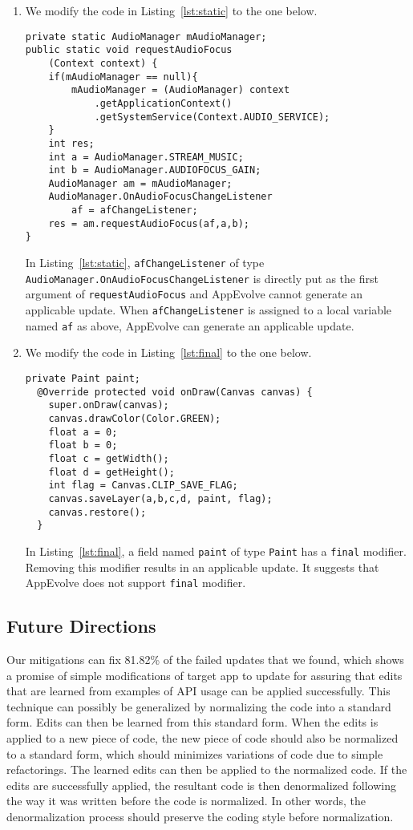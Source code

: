 \begin{enumerate}
\item We modify the code in Listing~\ref{lst:static} to the one below.
\begin{lstlisting}[language=text,numbers=none]
private static AudioManager mAudioManager;
public static void requestAudioFocus
    (Context context) {
    if(mAudioManager == null){
        mAudioManager = (AudioManager) context
            .getApplicationContext()
            .getSystemService(Context.AUDIO_SERVICE);
    }
    int res;
    int a = AudioManager.STREAM_MUSIC;
    int b = AudioManager.AUDIOFOCUS_GAIN;
    AudioManager am = mAudioManager;
    AudioManager.OnAudioFocusChangeListener
        af = afChangeListener;
    res = am.requestAudioFocus(af,a,b);
}
\end{lstlisting}
In Listing~\ref{lst:static}, {\tt afChangeListener} of type {\tt AudioManager.OnAudioFocusChangeListener} is directly put as the first argument of {\tt requestAudioFocus} and AppEvolve cannot generate an applicable update. When {\tt afChangeListener} is assigned to a local variable named {\tt af} as above, AppEvolve can generate an applicable update.

\item We modify the code in Listing~\ref{lst:final} to the one below.
\begin{lstlisting}[language=text,numbers=none]
private Paint paint;
  @Override protected void onDraw(Canvas canvas) {
    super.onDraw(canvas);
    canvas.drawColor(Color.GREEN);
    float a = 0;
    float b = 0;
    float c = getWidth();
    float d = getHeight();
    int flag = Canvas.CLIP_SAVE_FLAG;
    canvas.saveLayer(a,b,c,d, paint, flag);
    canvas.restore();
  }
\end{lstlisting}
In Listing~\ref{lst:final}, a field named {\tt paint} of type {\tt Paint} has a {\tt final} modifier. Removing this modifier results in an applicable update. It suggests that AppEvolve does not support {\tt final} modifier.
\end{enumerate}


\subsection{Future Directions}
Our mitigations can fix 81.82\% of the failed updates that we found, which shows a promise of simple modifications of target app to update for assuring that edits that are learned from examples of API usage can be applied successfully. This technique can possibly be generalized by normalizing the code into a standard form. Edits can then be learned from this standard form. When the edits is applied to a new piece of code, the new piece of code should also be normalized to a standard form, which should minimizes variations of code due to simple refactorings. The learned edits can then be applied to the normalized code. If the edits are successfully applied, the resultant code is then denormalized following the way it was written before the code is normalized. In other words, the denormalization process should preserve the coding style before normalization.

